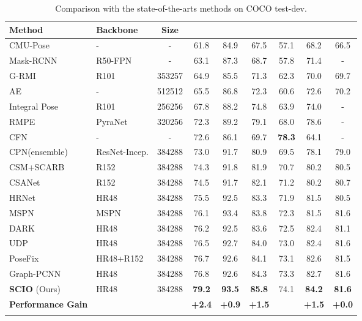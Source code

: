 \documentclass[runningheads]{llncs}
\begin{document}
\begin{table}
\begin{center}
\caption{
Comparison with the state-of-the-arts methods on COCO test-dev.
}
\label{tab:sota on COCO}
\begin{tabular}{l|l|ccccccc}
\hline\noalign{\smallskip}
Method & Backbone & Size & \text{} &  &  &   &  &   \\
\hline\noalign{\smallskip}
CMU-Pose \cite{DBLP:conf/cvpr/CaoSWS17} & - & - & 61.8 & 84.9 & 67.5 & 57.1 & 68.2 & 66.5\\
Mask-RCNN \cite{He_2017_ICCV} & R50-FPN & - & 63.1 & 87.3 & 68.7 & 57.8 & 71.4 & - \\
G-RMI \cite{DBLP:conf/cvpr/PapandreouZKTTB17} & R101 & 353257 & 64.9& 85.5 &71.3& 62.3&70.0 &69.7\\
AE \cite{DBLP:conf/nips/NewellHD17} & - &  512512& 65.5& 86.8& 72.3& 60.6& 72.6 &70.2\\
Integral Pose \cite{DBLP:conf/eccv/SunXWLW18} & R101 & 256256& 67.8 &88.2& 74.8 &63.9 &74.0 &-\\
RMPE \cite{Fang_2017_ICCV} &PyraNet& 320256& 72.3& 89.2 &79.1& 68.0& 78.6& -\\
CFN \cite{DBLP:conf/iccv/HuangGT17} & -& -& 72.6& 86.1& 69.7& \textbf{78.3}& 64.1& -\\
CPN(ensemble) \cite{Chen_2018_CVPR}& ResNet-Incep. &384288 &73.0& 91.7& 80.9 &69.5& 78.1 &79.0\\
CSM+SCARB \cite{DBLP:conf/cvpr/SuYXGW19} & R152& 384288 &74.3 &91.8& 81.9 &70.7 &80.2 &80.5\\
CSANet \cite{DBLP:journals/corr/abs-1905-05355} & R152& 384288& 74.5& 91.7 &82.1& 71.2 &80.2& 80.7\\
HRNet \cite{DBLP:conf/cvpr/0009XLW19} & HR48& 384288 &75.5& 92.5& 83.3& 71.9 &81.5& 80.5\\
MSPN \cite{DBLP:journals/corr/abs-1901-00148} & MSPN &384288 &76.1& {93.4} &83.8& 72.3 &81.5& 81.6\\
DARK \cite{DBLP:conf/cvpr/ZhangZD0Z20} &  HR48& 384288 &76.2& 92.5& 83.6& 72.5 &82.4& 81.1\\
UDP \cite{DBLP:conf/cvpr/0005ZGH20} &  HR48 &384288& 76.5 &92.7& 84.0& 73.0& 82.4& 81.6\\
PoseFix \cite{DBLP:conf/cvpr/MoonCL19}&  HR48+R152& 384288 &76.7 &92.6& 84.1& 73.1& 82.6& 81.5\\
Graph-PCNN \cite{DBLP:conf/eccv/WangLGDW20} & HR48 &384288 &76.8& 92.6& 84.3& 73.3& 82.7 &81.6\\
\hline\noalign{\smallskip}
\textbf{SCIO} (Ours) & HR48 & 384288 & \textbf{79.2} &  \textbf{93.5} & \textbf{85.8} & 74.1 & \textbf{84.2} & \textbf{81.6}\\
\textbf{Performance Gain} & & & \textbf{+2.4} &\textbf{+0.9}&\textbf{+1.5}&&\textbf{+1.5}&\textbf{+0.0}\\
\hline\noalign{\smallskip}
\end{tabular}
\end{center}
\end{table}
\vspace{-1.0cm}
\end{document}
